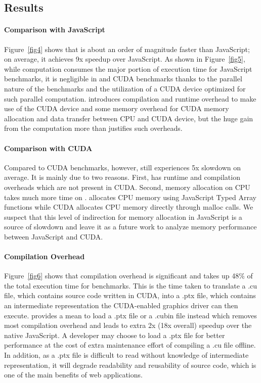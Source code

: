 
\subsection{Results}

\paragraph{Comparison with JavaScript} Figure~\ref{fig4} shows that \name is
about an order of magnitude faster than JavaScript; on average, it achieves 9x
speedup over JavaScript. As shown in Figure~\ref{fig5}, while computation
consumes the major portion of execution time for JavaScript benchmarks, it is
negligible in \name and CUDA benchmarks thanks to the parallel
nature of the benchmarks and the utilization of a CUDA device optimized for such
parallel computation. \name introduces compilation and runtime overhead to make
use of the CUDA device and some memory overhead for CUDA memory allocation and data
transfer between CPU and CUDA device, but the huge gain from the computation
more than justifies such overheads.

\paragraph{Comparison with CUDA} Compared to CUDA benchmarks, however, \name
still experiences 5x slowdown on average. It is mainly due to two reasons.
First, \name has runtime and compilation overheads which are not present in CUDA.
Second, memory allocation on CPU takes much more time on \namens. \name
allocates CPU memory using JavaScript Typed Array functions while CUDA
allocates CPU memory directly through malloc calls. We suspect that this level of
indirection for memory allocation in JavaScript is a source of slowdown
and leave it as a future work to analyze memory performance between JavaScript
and CUDA.

\paragraph{Compilation Overhead} Figure~\ref{fig6} shows that compilation
overhead is significant and takes up 48\% of the total execution time for \name
benchmarks. This is the time taken to translate a .cu file, which contains source code
written in CUDA, into a .ptx file, which contains an intermediate
representation the CUDA-enabled graphics driver can then execute. \name provides a mean to
load a .ptx file or a .cubin file instead which removes most
compilation overhead and leads to extra 2x (18x overall) speedup over the native JavaScript. A
developer may choose to load a .ptx file for better performance at the cost of
extra maintenance effort of compiling a .cu file offline. In addition, as a .ptx
file is difficult to read without knowledge of intermediate representation, it
will degrade readability and reusability of source code, which is one of the main
benefits of web applications.


